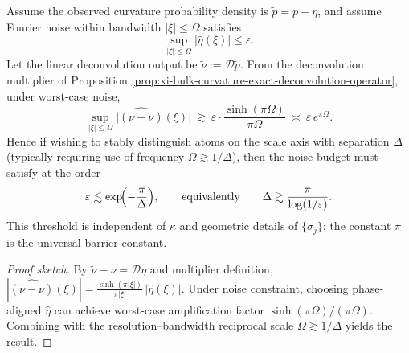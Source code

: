 \begin{corollary}\label{cor:xi-bulk-curvature-superresolution-pi-barrier}
Assume the observed curvature probability density is \(\widetilde p=p+\eta\), and assume Fourier noise within bandwidth \(|\xi|\le\Omega\) satisfies
\[
\sup_{|\xi|\le\Omega}|\widehat\eta(\xi)|\le\varepsilon.
\]
Let the linear deconvolution output be \(\widetilde\nu:=\mathcal D\widetilde p\).
From the deconvolution multiplier of Proposition \ref{prop:xi-bulk-curvature-exact-deconvolution-operator}, under worst-case noise,
\[
\sup_{|\xi|\le\Omega}\bigl|\widehat{(\widetilde\nu-\nu)}(\xi)\bigr|
\ \gtrsim\
\varepsilon\cdot \frac{\sinh(\pi\Omega)}{\pi\Omega}
\ \asymp\
\varepsilon\,e^{\pi\Omega}.
\]
Hence if wishing to stably distinguish atoms on the scale axis with separation \(\Delta\) (typically requiring use of frequency \(\Omega\gtrsim 1/\Delta\)), then the noise budget must satisfy at the order
\[
\varepsilon \lesssim \exp\!\Bigl(-\frac{\pi}{\Delta}\Bigr),
\qquad\text{equivalently}\qquad
\Delta \gtrsim \frac{\pi}{\log(1/\varepsilon)}.
\]
This threshold is independent of \(\kappa\) and geometric details of \(\{\sigma_j\}\); the constant \(\pi\) is the universal barrier constant.
\end{corollary}
\begin{proof}[Proof sketch]
By \(\widetilde\nu-\nu=\mathcal D\eta\) and multiplier definition,
\(
|\widehat{(\widetilde\nu-\nu)}(\xi)|
=\frac{\sinh(\pi|\xi|)}{\pi|\xi|}\,|\widehat\eta(\xi)|
\).
Under noise constraint, choosing phase-aligned \(\widehat\eta\) can achieve worst-case amplification factor \(\sinh(\pi\Omega)/(\pi\Omega)\).
Combining with the resolution--bandwidth reciprocal scale \(\Omega\gtrsim 1/\Delta\) yields the result.
\end{proof}


